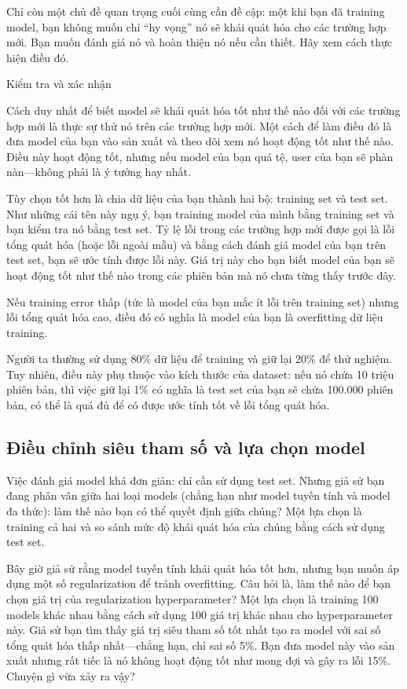 Chỉ còn một chủ đề quan trọng cuối cùng cần đề cập: một khi bạn đã training model, bạn không muốn chỉ “hy vọng” nó sẽ khái quát hóa cho các trường hợp mới. Bạn muốn đánh giá nó và hoàn thiện nó nếu cần thiết. Hãy xem cách thực hiện điều đó.

Kiểm tra và xác nhận

Cách duy nhất để biết model sẽ khái quát hóa tốt như thế nào đối với các trường hợp mới là thực sự thử nó trên các trường hợp mới. Một cách để làm điều đó là đưa model của bạn vào sản xuất và theo dõi xem nó hoạt động tốt như thế nào. Điều này hoạt động tốt, nhưng nếu model của bạn quá tệ, user của bạn sẽ phàn nàn—không phải là ý tưởng hay nhất.

Tùy chọn tốt hơn là chia dữ liệu của bạn thành hai bộ: training set và test set. Như những cái tên này ngụ ý, bạn training model của mình bằng training set và bạn kiểm tra nó bằng test set. Tỷ lệ lỗi trong các trường hợp mới được gọi là lỗi tổng quát hóa (hoặc lỗi ngoài mẫu) và bằng cách đánh giá model của bạn trên test set, bạn sẽ ước tính được lỗi này. Giá trị này cho bạn biết model của bạn sẽ hoạt động tốt như thế nào trong các phiên bản mà nó chưa từng thấy trước đây.

Nếu training error thấp (tức là model của bạn mắc ít lỗi trên training set) nhưng lỗi tổng quát hóa cao, điều đó có nghĩa là model của bạn là overfitting dữ liệu training.

Người ta thường sử dụng 80\% dữ liệu để training và giữ lại 20\% để thử nghiệm. Tuy nhiên, điều này phụ thuộc vào kích thước của dataset: nếu nó chứa 10 triệu phiên bản, thì việc giữ lại 1\% có nghĩa là test set của bạn sẽ chứa 100.000 phiên bản, có thể là quá đủ để có được ước tính tốt về lỗi tổng quát hóa.

\subsection{Điều chỉnh siêu tham số và lựa chọn model}

Việc đánh giá model khá đơn giản: chỉ cần sử dụng test set. Nhưng giả sử bạn đang phân vân giữa hai loại models (chẳng hạn như model tuyến tính và model đa thức): làm thế nào bạn có thể quyết định giữa chúng? Một lựa chọn là training cả hai và so sánh mức độ khái quát hóa của chúng bằng cách sử dụng test set.

Bây giờ giả sử rằng model tuyến tính khái quát hóa tốt hơn, nhưng bạn muốn áp dụng một số regularization để tránh overfitting. Câu hỏi là, làm thế nào để bạn chọn giá trị của regularization hyperparameter? Một lựa chọn là training 100 models khác nhau bằng cách sử dụng 100 giá trị khác nhau cho hyperparameter này. Giả sử bạn tìm thấy giá trị siêu tham số tốt nhất tạo ra model với sai số tổng quát hóa thấp nhất—chẳng hạn, chỉ sai số 5\%. Bạn đưa model này vào sản xuất nhưng rất tiếc là nó không hoạt động tốt như mong đợi và gây ra lỗi 15\%. Chuyện gì vừa xảy ra vậy?

